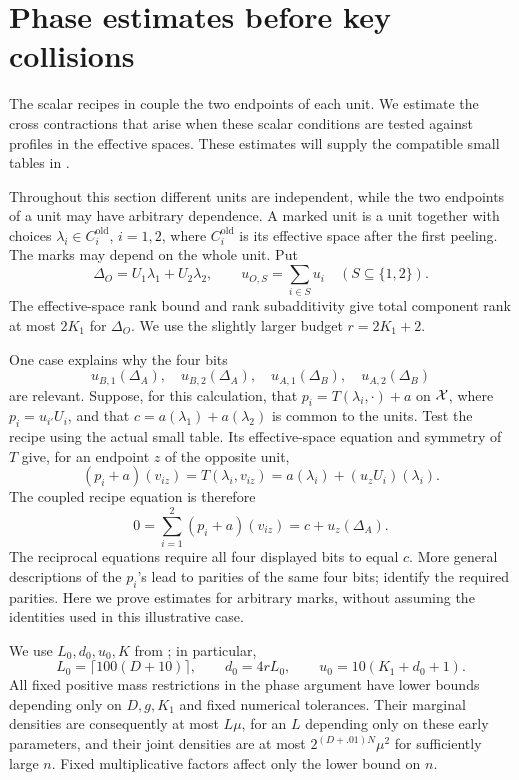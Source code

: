 \section{Phase estimates before key collisions}
\label{sec:phases}

The scalar recipes in  couple the two
endpoints of each unit. We estimate the cross contractions that arise
when these scalar conditions are tested against profiles in the
effective spaces. These estimates will supply the compatible small
tables in .

Throughout this section different units are independent, while the two
endpoints of a unit may have arbitrary dependence. A marked unit is a
unit together with choices
\(\lambda_i\in C_i^{\mathrm{old}}\), \(i=1,2\), where
\(C_i^{\mathrm{old}}\) is its effective space after the first peeling.
The marks may depend on the whole unit. Put
\begin{equation}
 \Delta_O=U_1\lambda_1+U_2\lambda_2,
 \qquad u_{O,S}=\sum_{i\in S}u_i
 \quad(S\subseteq\{1,2\}).
 \label{eq:delta-phase}
\end{equation}
The effective-space rank bound and rank subadditivity give total
component rank at most \(2K_1\) for \(\Delta_O\). We use the slightly
larger budget \(r=2K_1+2\).

One case explains why the four bits
\[
 u_{B,1}(\Delta_A),\quad u_{B,2}(\Delta_A),\quad
 u_{A,1}(\Delta_B),\quad u_{A,2}(\Delta_B)
\]
are relevant. Suppose, for this calculation, that
\(p_i=T(\lambda_i,\cdot)+a\) on \(\mathcal X\), where
\(p_i=u_{i'}U_i\), and that
\(c=a(\lambda_1)+a(\lambda_2)\) is common to the units.
Test the recipe using the actual small table. Its effective-space
equation and symmetry of \(T\) give, for an endpoint \(z\) of the
opposite unit,
\[
 (p_i+a)(v_{iz})
 =T(\lambda_i,v_{iz})
 =a(\lambda_i)+(u_zU_i)(\lambda_i).
\]
The coupled recipe equation is therefore
\[
 0=\sum_{i=1}^2(p_i+a)(v_{iz})
   =c+u_z(\Delta_A).
\]
The reciprocal equations require all four displayed bits to equal
\(c\). More general descriptions of the \(p_i\)'s lead to parities
of the same four bits;  identify
the required parities. Here we prove estimates for arbitrary marks,
without assuming the identities used in this illustrative case.

We use \(L_0,d_0,u_0,K\) from
; in particular,
\[
 L_0=\lceil100(D+10)\rceil,
 \qquad d_0=4rL_0,
 \qquad u_0=10(K_1+d_0+1).
\]
All fixed positive mass restrictions in the phase argument have lower
bounds depending only on \(D,g,K_1\) and fixed numerical tolerances.
Their marginal densities are consequently at most \(L\mu\), for an
\(L\) depending only on these early parameters, and their joint
densities are at most \(2^{(D+.01)N}\mu^2\) for sufficiently large
\(n\). Fixed multiplicative factors affect only the lower bound on
\(n\).

